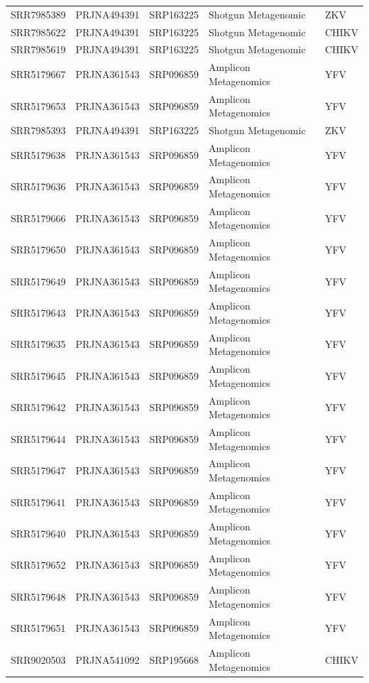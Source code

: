 \begin{longtable}{@{}lllll@{}}
SRR7985389 & PRJNA494391 & SRP163225 & Shotgun Metagenomic   & ZKV      \\
SRR7985622 & PRJNA494391 & SRP163225 & Shotgun Metagenomic   & CHIKV    \\
SRR7985619 & PRJNA494391 & SRP163225 & Shotgun Metagenomic   & CHIKV    \\
SRR5179667 & PRJNA361543 & SRP096859 & Amplicon Metagenomics & YFV      \\
SRR5179653 & PRJNA361543 & SRP096859 & Amplicon Metagenomics & YFV      \\
SRR7985393 & PRJNA494391 & SRP163225 & Shotgun Metagenomic   & ZKV      \\
SRR5179638 & PRJNA361543 & SRP096859 & Amplicon Metagenomics & YFV      \\
SRR5179636 & PRJNA361543 & SRP096859 & Amplicon Metagenomics & YFV      \\
SRR5179666 & PRJNA361543 & SRP096859 & Amplicon Metagenomics & YFV      \\
SRR5179650 & PRJNA361543 & SRP096859 & Amplicon Metagenomics & YFV      \\
SRR5179649 & PRJNA361543 & SRP096859 & Amplicon Metagenomics & YFV      \\
SRR5179643 & PRJNA361543 & SRP096859 & Amplicon Metagenomics & YFV      \\
SRR5179635 & PRJNA361543 & SRP096859 & Amplicon Metagenomics & YFV      \\
SRR5179645 & PRJNA361543 & SRP096859 & Amplicon Metagenomics & YFV      \\
SRR5179642 & PRJNA361543 & SRP096859 & Amplicon Metagenomics & YFV      \\
SRR5179644 & PRJNA361543 & SRP096859 & Amplicon Metagenomics & YFV      \\
SRR5179647 & PRJNA361543 & SRP096859 & Amplicon Metagenomics & YFV      \\
SRR5179641 & PRJNA361543 & SRP096859 & Amplicon Metagenomics & YFV      \\
SRR5179640 & PRJNA361543 & SRP096859 & Amplicon Metagenomics & YFV      \\
SRR5179652 & PRJNA361543 & SRP096859 & Amplicon Metagenomics & YFV      \\
SRR5179648 & PRJNA361543 & SRP096859 & Amplicon Metagenomics & YFV      \\
SRR5179651 & PRJNA361543 & SRP096859 & Amplicon Metagenomics & YFV      \\
SRR9020503 & PRJNA541092 & SRP195668 & Amplicon Metagenomics & CHIKV    \\

\end{longtable}
